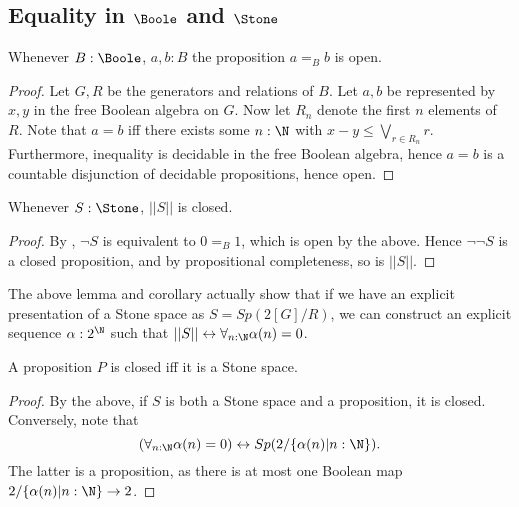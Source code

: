 \subsection{Equality in $\Boole$ and $\Stone$}
\begin{lemma}\label{BooleEqualityOpen}
  Whenever $B:\Boole$, $a,b:B$ the proposition $a=_Bb$ is open. 
\end{lemma}
\begin{proof}
  Let $G,R$ be the generators and relations of $B$. 
  Let $a,b$ be represented by $x,y$ in the free Boolean algebra on $G$. 
  Now let $R_n$ denote the first $n$ elements of $R$. 
  Note that $a=b$ iff there exists some $n:\N$ with $x-y \leq \bigvee_{r\in R_n} r$. 
  Furthermore, inequality is decidable in the free Boolean algebra, hence
  $a=b$ is a countable disjunction of decidable propositions, hence open. 
\end{proof}


\begin{corollary}\label{TruncationStoneClosed}
  Whenever $S:\Stone$, $||S||$ is closed. 
\end{corollary}
\begin{proof}
  By , $\neg S$ is equivalent to $0=_B 1$, which is open by the above. 
  Hence $\neg \neg S$ is a closed proposition, and by propositional completeness, so is $||S||$. 
\end{proof}

\begin{remark}\label{ExplicitTruncationStoneClosed}
  The above lemma and corollary actually show that if we have an explicit 
  presentation of a Stone space as $S = Sp(2[G] / R)$, 
  we can construct an explicit sequence $\alpha:2^\N$ such that $||S|| \leftrightarrow \forall_{n:\N} \alpha(n) = 0$. 
\end{remark}


\begin{corollary}\label{PropositionsClosedIffStone}
  A proposition $P$ is closed iff it is a Stone space. 
\end{corollary}
\begin{proof}
  By the above, if $S$ is both a Stone space and a proposition, it is closed. 
  Conversely, note that 
  $$
  (\forall_{n:\N} \alpha(n) = 0 )\leftrightarrow Sp(2/\{\alpha(n)| n:\N\}).
  $$
  The latter is a proposition, as there is at most one Boolean map $2/\{\alpha(n)|n:\N\} \to 2$.
\end{proof}

